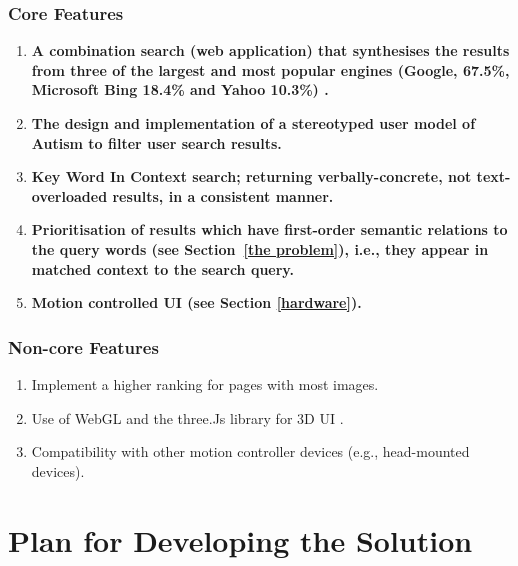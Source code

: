\documentclass[a4paper, 10pt]{article}
\begin{document}
\subsubsection{Core Features}\label{core}
\begin{enumerate}
\item  \textbf{A combination search (web application) that synthesises the results from three of the largest and most popular engines (Google, 67.5\%, Microsoft Bing 18.4\% and Yahoo 10.3\%) \cite{adam}.}

\item \textbf{The design and implementation of a stereotyped user model of Autism to filter user search results.}

\item \textbf{Key Word In Context search; returning verbally-concrete, not text-overloaded results, in a consistent manner. }

\item \textbf{Prioritisation of results which have first-order semantic relations to the query words (see Section~\ref{the problem}), i.e., they appear in matched context to the search query.}

\item \textbf{Motion controlled UI (see Section \ref{hardware}).}
\end{enumerate}

\subsubsection{Non-core Features}
\begin{enumerate}

\item Implement a higher ranking for pages with most images. 
\item Use of WebGL and the three.Js library for 3D UI .
\item Compatibility with other motion controller devices (e.g., head-mounted devices).

\end{enumerate}

\section{Plan for Developing the Solution}
\end{document}
